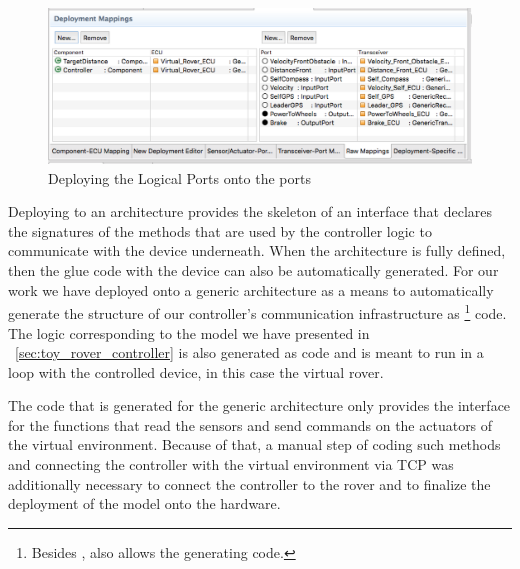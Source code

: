 \begin{figure}[!h]
\centering
\includegraphics[width=1\textwidth]{images/deployment_ports_mapping.png}
\caption{Deploying the Logical Ports onto the \ecu ports}
\label{fig:deployment_ports}
\end{figure}
 
Deploying to an architecture provides the skeleton of an interface that declares
the signatures of the methods that are used by the controller logic to
communicate with the device underneath. When the architecture is fully defined,
then the glue code with the device can also be automatically generated. For our
work we have deployed onto a generic architecture as a means to automatically
generate the structure of our controller's communication infrastructure as \clang\footnote{Besides \clang, \af also allows the generating \java code.} code. The logic corresponding to the model we have presented in
\sect~\ref{sec:toy_rover_controller} is also generated as \clang code and is
meant to run in a loop with the controlled device, in this case the virtual
rover.

The \clang code that is generated for the generic architecture only provides the
interface for the functions that read the sensors and send commands on the
actuators of the virtual environment. Because of that, a manual step of
coding such methods and connecting the controller with the virtual environment
via TCP was additionally necessary to connect the controller to the rover and to
finalize the deployment of the model onto the hardware.


